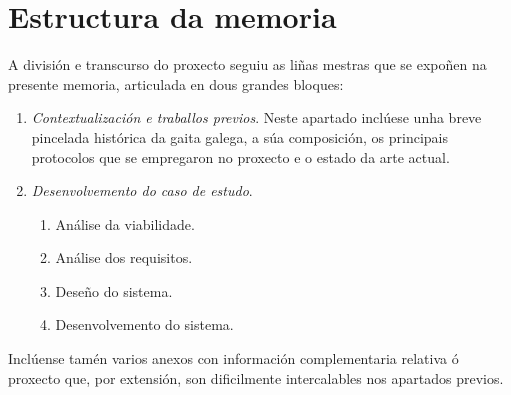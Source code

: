 \section{Estructura da memoria}

 A división e transcurso do proxecto seguiu as liñas mestras que se expoñen na
 presente memoria, articulada en dous grandes bloques:

 \begin{enumerate}
  \item \textit{Contextualización e traballos previos}. Neste apartado
        inclúese unha breve pincelada histórica da gaita galega, a súa
        composición, os principais protocolos que se empregaron no proxecto e
        o estado da arte actual.
        
  \item \textit{Desenvolvemento do caso de estudo}.
        \begin{enumerate}
         \item Análise da viabilidade.
         \item Análise dos requisitos.
         \item Deseño do sistema.
         \item Desenvolvemento do sistema.
        \end{enumerate}
 \end{enumerate}

 Inclúense tamén varios anexos con información complementaria relativa ó
 proxecto que, por extensión, son dificilmente intercalables nos apartados
 previos.
